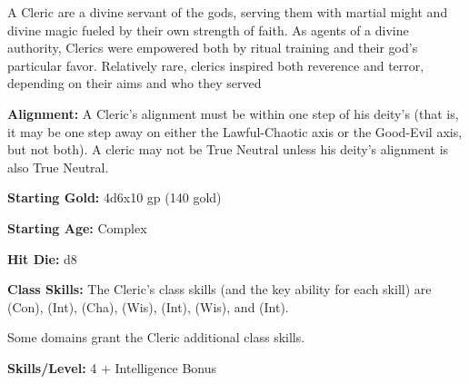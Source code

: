
A Cleric are a divine servant of the gods, serving them with martial might and divine magic fueled by their own strength of faith. As agents of a divine authority, Clerics were empowered both by ritual training and their god's particular favor. Relatively rare, clerics inspired both reverence and terror, depending on their aims and who they served

\textbf{Alignment:} A Cleric's alignment must be within one step of his deity's (that is, it may be one step away on either the Lawful-Chaotic axis or the Good-Evil axis, but not both). A cleric may not be True Neutral unless his deity's alignment is also True Neutral.

\textbf{Starting Gold:} 4d6x10 gp (140 gold)

\textbf{Starting Age:} Complex

\textbf{Hit Die:} d8

\textbf{Class Skills:} The Cleric's class skills (and the key ability for each skill) are  (Con),  (Int),  (Cha),  (Wis),  (Int),  (Wis), and  (Int).

Some domains grant the Cleric additional class skills.

\textbf{Skills/Level:} 4 + Intelligence Bonus

\modebab{}
\goodfor{}
\poorref{}
\goodwil{}

\begin{fullcastingclasstable}
\end{fullcastingclasstable}

